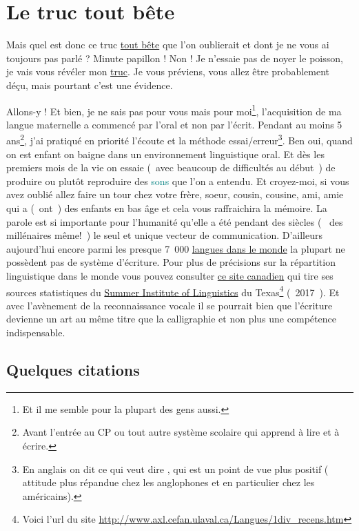 \section{Le truc tout bête}\label{sec:truc}
Mais quel est donc ce truc \underline{tout bête} que l'on oublierait et dont je
ne vous ai toujours pas parlé ? Minute papillon ! Non ! Je n'essaie
pas de noyer le poisson, je vais vous révéler mon \underline{truc}. Je vous
préviens, vous allez être probablement déçu, mais pourtant c'est une
évidence. \par
Allons-y ! Et bien, je ne sais pas pour vous mais pour moi\footnote{Et il me
semble pour la plupart des gens aussi.}, l'acquisition de ma langue
maternelle a commencé par l'oral et non par l'écrit. Pendant au moins
5 ans\footnote{Avant l'entrée au CP ou tout autre système scolaire qui
apprend à lire et à écrire.}, j'ai pratiqué en priorité l'écoute et la
méthode essai/erreur\footnote{En anglais on dit  ce qui veut
dire , qui est un point de vue plus positif (
attitude plus répandue chez les anglophones et en particulier chez les américains).}. Ben
oui, quand on est enfant on baigne dans un environnement linguistique
oral. Et dès les premiers mois de la vie on essaie (~avec beaucoup de
difficultés au début~) de produire ou plutôt reproduire des \textcolor{teal}{sons} que
l'on a entendu. Et croyez-moi, si vous avez oublié allez faire un tour
chez votre frère, soeur, cousin, cousine, ami, amie qui a (~ont~) des
enfants en bas âge et cela vous raffraichira la mémoire. La parole est
si importante pour l'humanité qu'elle a été pendant des siècles (~ des
millénaires même!~) le seul et unique vecteur de
communication. D'ailleurs aujourd'hui encore parmi les presque 7~000
\href{http://www.museedelhomme.fr/fr/combien-langues-sont-parlees-monde}{langues dans le monde} la plupart ne possèdent pas de système
d'écriture. Pour plus de précisions sur la répartition linguistique
dans le monde vous pouvez consulter \href{http://www.axl.cefan.ulaval.ca/Langues/1div\_recens.htm}{ce site canadien} qui tire ses
sources statistiques du \underline{Summer Institute of Linguistics} du
Texas\footnote{Voici l'url du site
  \url{http://www.axl.cefan.ulaval.ca/Langues/1div_recens.htm}}
(~2017~). Et avec l'avènement de la reconnaissance vocale il se
pourrait bien que l'écriture devienne un art au même titre que la
calligraphie et non plus une compétence indispensable.

\newpage

\subsection{Quelques citations}\label{subsec:quote}


